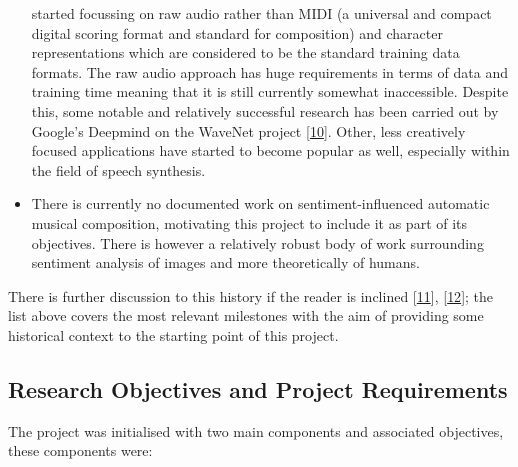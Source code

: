\documentclass[12pt,]{article}
\begin{document}
\begin{itemize}
  started focussing on raw audio rather than MIDI (a universal and
  compact digital scoring format and standard for composition) and
  character representations which are considered to be the standard
  training data formats. The raw audio approach has huge requirements in
  terms of data and training time meaning that it is still currently
  somewhat inaccessible. Despite this, some notable and relatively
  successful research has been carried out by Google's Deepmind on the
  WaveNet project {[}\protect\hyperlink{ref-oord2016wavenet}{10}{]}.
  Other, less creatively focused applications have started to become
  popular as well, especially within the field of speech synthesis.
\item
  There is currently no documented work on sentiment-influenced
  automatic musical composition, motivating this project to include it
  as part of its objectives. There is however a relatively robust body
  of work surrounding sentiment analysis of images and more
  theoretically of humans.
\end{itemize}

There is further discussion to this history if the reader is inclined
{[}\protect\hyperlink{ref-mediumkylemcdonald}{11}{]},
{[}\protect\hyperlink{ref-libdlmusic}{12}{]}; the list above covers the
most relevant milestones with the aim of providing some historical
context to the starting point of this project.

\hypertarget{research-objectives-and-project-requirements}{%
\subsection{Research Objectives and Project
Requirements}\label{research-objectives-and-project-requirements}}

The project was initialised with two main components and associated
objectives, these components were:
\end{document}
